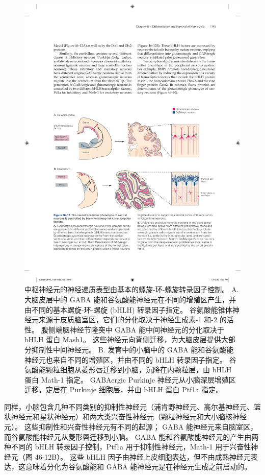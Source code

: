 \begin{figure}[htbp]
	\centering
	\includegraphics[width=0.9\linewidth]{chap46/fig_46_12}
	\caption{中枢神经元的神经递质表型由基本的螺旋-环-螺旋转录因子控制。 A. 大脑皮层中的 GABA 能和谷氨酸能神经元在不同的增殖区产生，并由不同的基本螺旋-环-螺旋 (bHLH) 转录因子指定。 谷氨酸能锥体神经元来源于皮质脑室区，它们的分化取决于神经生成素-1 和-2 的活性。 腹侧端脑神经节隆突中 GABA 能中间神经元的分化取决于 bHLH 蛋白 Mash1。 这些神经元向背侧迁移，为大脑皮层提供大部分抑制性中间神经元。 B. 发育中的小脑中的 GABA 能和谷氨酸能神经元也来自不同的增殖区，并由不同的 bHLH 转录因子指定。 谷氨酸能颗粒细胞从菱形唇迁移到小脑，沉降在内颗粒层，由 bHLH 蛋白 Math-1 指定。 GABAergic Purkinje 神经元从小脑深层增殖区迁移，定居在 Purkinje 细胞层，并由 bHLH 蛋白 Ptf1a 指定。}
	\label{fig:46_12}
\end{figure}

同样，小脑包含几种不同类别的抑制性神经元（浦肯野神经元、高尔基神经元、篮状神经元和星状神经元）和两大类兴奋性神经元（颗粒神经元和大小脑核神经元）。 这些抑制性和兴奋性神经元有不同的起源； GABA 能神经元来自脑室区，而谷氨酸能神经元从菱形唇迁移到小脑。 GABA 能和谷氨酸能神经元的产生由两种不同的 bHLH 转录因子控制，Ptf1a 用于抑制性神经元，Math-1 用于兴奋性神经元（图 46-12B）。 这些 bHLH 因子由神经上皮细胞表达，但不由成熟神经元表达，这意味着分化为谷氨酸能和 GABA 能神经元是在神经元生成之前启动的。

